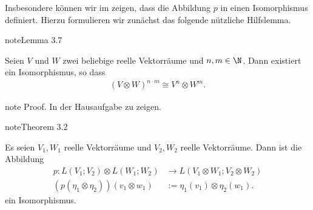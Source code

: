 \documentclass[letterpaper,10pt,english]{jupyterBook}
\begin{document}
\sphinxAtStartPar
Insbesondere können wir im  zeigen, dass die Abbildung \(p\) in {\hyperref[\detokenize{vektoranalysis/tensor:lem:LISO}]{}} einen Isomorphismus definiert.
Hierzu formulieren wir zunächst das folgende nützliche Hilfslemma.
\label{vektoranalysis/tensor:lem:isomorphieKartesischesProdukt}
\begin{sphinxadmonition}{note}{Lemma 3.7}



\sphinxAtStartPar
Seien \(V\) und \(W\) zwei beliebige reelle Vektorräume und \(n,m \in \N\).
Dann existiert ein Isomorphismus, so dass
\begin{equation*}
\begin{split}(V \otimes W)^{n\cdot m} \cong V^n \otimes W^m.\end{split}
\end{equation*}\end{sphinxadmonition}

\begin{sphinxadmonition}{note}
\sphinxAtStartPar
Proof. In der Hausaufgabe zu zeigen.
\end{sphinxadmonition}
\label{vektoranalysis/tensor:thm:pIsomorphismus}
\begin{sphinxadmonition}{note}{Theorem 3.2}



\sphinxAtStartPar
Es seien \(V_1, W_1\) reelle  Vektorräume und \(V_2, W_2\)  reelle Vektorräume.
Dann ist die Abbildung
\begin{equation*}
\begin{split}p:L(V_1; V_2)\otimes L(W_1; W_2) &\rightarrow L(V_1\otimes W_1; V_2\otimes W_2)\\
(p(\eta_1\otimes\eta_2))(v_1\otimes w_1)&:= \eta_1(v_1) \otimes \eta_2(w_1).\end{split}
\end{equation*}
\sphinxAtStartPar
ein Isomorphismus.
\end{sphinxadmonition}
\end{document}
